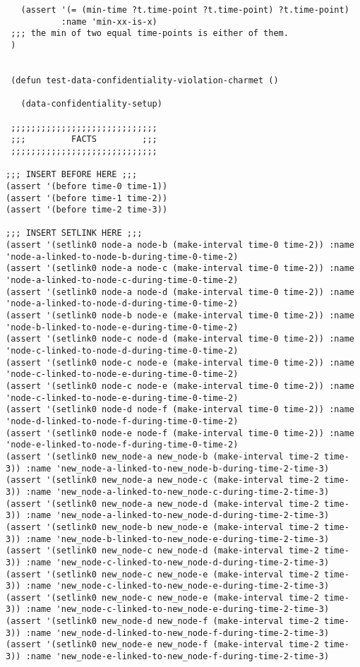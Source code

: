\begin{lstlisting}
   (assert '(= (min-time ?t.time-point ?t.time-point) ?t.time-point)
           :name 'min-xx-is-x)
 ;;; the min of two equal time-points is either of them.
 )


 (defun test-data-confidentiality-violation-charmet ()

   (data-confidentiality-setup)

 ;;;;;;;;;;;;;;;;;;;;;;;;;;;;;
 ;;;         FACTS         ;;;
 ;;;;;;;;;;;;;;;;;;;;;;;;;;;;;
  
;;; INSERT BEFORE HERE ;;;
(assert '(before time-0 time-1))
(assert '(before time-1 time-2))
(assert '(before time-2 time-3))

;;; INSERT SETLINK HERE ;;;
(assert '(setlink0 node-a node-b (make-interval time-0 time-2)) :name 'node-a-linked-to-node-b-during-time-0-time-2)
(assert '(setlink0 node-a node-c (make-interval time-0 time-2)) :name 'node-a-linked-to-node-c-during-time-0-time-2)
(assert '(setlink0 node-a node-d (make-interval time-0 time-2)) :name 'node-a-linked-to-node-d-during-time-0-time-2)
(assert '(setlink0 node-b node-e (make-interval time-0 time-2)) :name 'node-b-linked-to-node-e-during-time-0-time-2)
(assert '(setlink0 node-c node-d (make-interval time-0 time-2)) :name 'node-c-linked-to-node-d-during-time-0-time-2)
(assert '(setlink0 node-c node-e (make-interval time-0 time-2)) :name 'node-c-linked-to-node-e-during-time-0-time-2)
(assert '(setlink0 node-c node-e (make-interval time-0 time-2)) :name 'node-c-linked-to-node-e-during-time-0-time-2)
(assert '(setlink0 node-d node-f (make-interval time-0 time-2)) :name 'node-d-linked-to-node-f-during-time-0-time-2)
(assert '(setlink0 node-e node-f (make-interval time-0 time-2)) :name 'node-e-linked-to-node-f-during-time-0-time-2)
(assert '(setlink0 new_node-a new_node-b (make-interval time-2 time-3)) :name 'new_node-a-linked-to-new_node-b-during-time-2-time-3)
(assert '(setlink0 new_node-a new_node-c (make-interval time-2 time-3)) :name 'new_node-a-linked-to-new_node-c-during-time-2-time-3)
(assert '(setlink0 new_node-a new_node-d (make-interval time-2 time-3)) :name 'new_node-a-linked-to-new_node-d-during-time-2-time-3)
(assert '(setlink0 new_node-b new_node-e (make-interval time-2 time-3)) :name 'new_node-b-linked-to-new_node-e-during-time-2-time-3)
(assert '(setlink0 new_node-c new_node-d (make-interval time-2 time-3)) :name 'new_node-c-linked-to-new_node-d-during-time-2-time-3)
(assert '(setlink0 new_node-c new_node-e (make-interval time-2 time-3)) :name 'new_node-c-linked-to-new_node-e-during-time-2-time-3)
(assert '(setlink0 new_node-c new_node-e (make-interval time-2 time-3)) :name 'new_node-c-linked-to-new_node-e-during-time-2-time-3)
(assert '(setlink0 new_node-d new_node-f (make-interval time-2 time-3)) :name 'new_node-d-linked-to-new_node-f-during-time-2-time-3)
(assert '(setlink0 new_node-e new_node-f (make-interval time-2 time-3)) :name 'new_node-e-linked-to-new_node-f-during-time-2-time-3)


\end{lstlisting}
